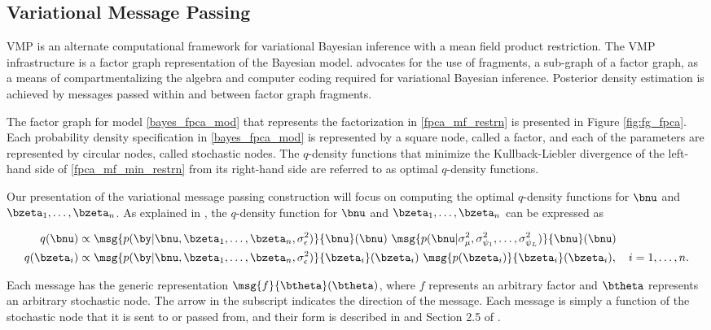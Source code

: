 \documentclass[12pt]{article}
\def\sigsqeps{\sigma^2_{\epsilon}}
\def\sigsqmu{\sigma^2_{\mu}}
\newcommand\sigsqpsi[1]{\sigma^2_{\psi_{#1}}}
\theoremstyle{plain}
\theoremstyle{definition}
\theoremstyle{remark}
\begin{document}

\subsection{Variational Message Passing}
\label{sec:vmp}

VMP is an alternate computational framework for variational Bayesian inference with a mean field product restriction.
The VMP infrastructure is a factor graph representation of the Bayesian model.  advocates for
the use of fragments, a sub-graph of a factor graph, as a means of compartmentalizing the algebra and computer
coding required for variational Bayesian inference. Posterior density estimation is achieved by messages passed
within and between factor graph fragments.

The factor graph for model \eqref{bayes_fpca_mod} that represents the factorization in \eqref{fpca_mf_restrn}
is presented in Figure \ref{fig:fg_fpca}. Each probability density specification in \eqref{bayes_fpca_mod} is
represented by a square node, called a factor, and each of the parameters are represented by circular nodes,
called stochastic nodes. The $q$-density functions that minimize the Kullback-Liebler divergence of
the left-hand side of \eqref{fpca_mf_min_restrn} from its right-hand side are referred to as optimal $q$-density
functions.

Our presentation of the variational message passing construction will focus on computing the optimal $q$-density
functions for $\bnu$ and $\bzeta_1, \dots, \bzeta_n$. As explained in , the $q$-density function for
$\bnu$ and $\bzeta_1, \dots, \bzeta_n$ can be expressed as

\begin{align}
\begin{split}
	q (\bnu)
		&\propto
			\msg{p (\by | \bnu, \bzeta_1, \dots, \bzeta_n, \sigsqeps)}{\bnu} (\bnu) \
			\msg{p (\bnu | \sigsqmu, \sigsqpsi{1}, \dots, \sigsqpsi{L})}{\bnu} (\bnu) \\
	q (\bzeta_i)
		&\propto
			\msg{p (\by | \bnu, \bzeta_1, \dots, \bzeta_n, \sigsqeps)}{\bzeta_i} (\bzeta_i) \
			\msg{p (\bzeta_i)}{\bzeta_i} (\bzeta_i), \quad
		i = 1, \dots, n.
\end{split}
\label{nu_zeta_q_dens_funcs}
\end{align}

\noindent Each message has the generic representation $\msg{f}{\btheta} (\btheta)$,
where $f$ represents an arbitrary factor and $\btheta$
represents an arbitrary stochastic node. The arrow in the subscript indicates the direction of the message. Each
message is simply a function of the stochastic node that it is sent to or passed from, and their form
is described in \citeA{minka05} and Section 2.5 of \citeA{wand17}.
\end{document}
